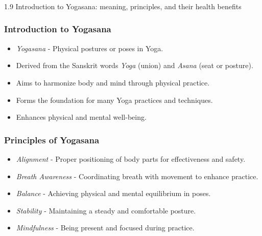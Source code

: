 \begin{frame}[fragile]\frametitle{}
\begin{center}
{\Large 1.9 Introduction to Yogasana: meaning, principles, and their health benefits}
\end{center}
\end{frame}

\begin{frame}[fragile]\frametitle{Introduction to Yogasana}

      \begin{itemize}
		\item \textit{Yogasana} - Physical postures or poses in Yoga.
		\item Derived from the Sanskrit words \textit{Yoga} (union) and \textit{Asana} (seat or posture).
		\item Aims to harmonize body and mind through physical practice.
		\item Forms the foundation for many Yoga practices and techniques.
		\item Enhances physical and mental well-being.
	  \end{itemize}

\end{frame}

\begin{frame}[fragile]\frametitle{Principles of Yogasana}

      \begin{itemize}
		\item \textit{Alignment} - Proper positioning of body parts for effectiveness and safety.
		\item \textit{Breath Awareness} - Coordinating breath with movement to enhance practice.
		\item \textit{Balance} - Achieving physical and mental equilibrium in poses.
		\item \textit{Stability} - Maintaining a steady and comfortable posture.
		\item \textit{Mindfulness} - Being present and focused during practice.
	  \end{itemize}

\end{frame}

